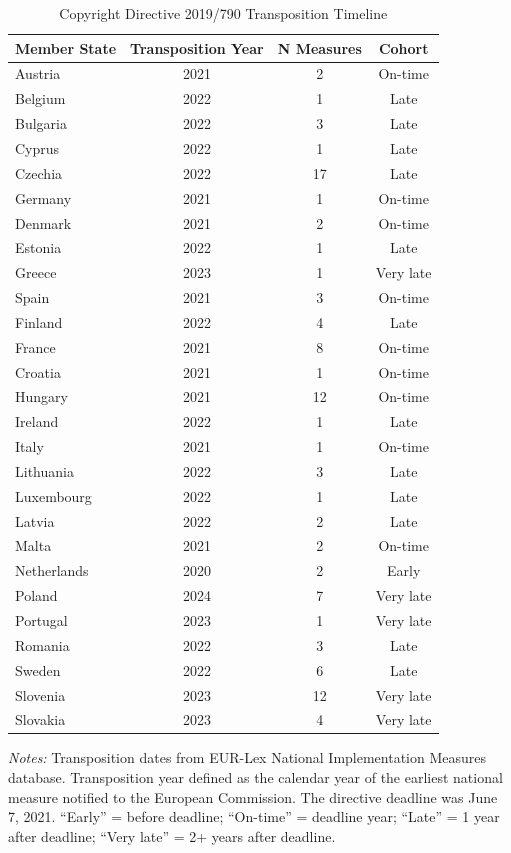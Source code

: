 \begin{table}[htbp]
\centering
\caption{Copyright Directive 2019/790 Transposition Timeline}
\label{tab:timeline}
\begin{tabular}{lccc}
\toprule
Member State & Transposition Year & N Measures & Cohort \\
\midrule
Austria & 2021 & 2 & On-time \\
Belgium & 2022 & 1 & Late \\
Bulgaria & 2022 & 3 & Late \\
Cyprus & 2022 & 1 & Late \\
Czechia & 2022 & 17 & Late \\
Germany & 2021 & 1 & On-time \\
Denmark & 2021 & 2 & On-time \\
Estonia & 2022 & 1 & Late \\
Greece & 2023 & 1 & Very late \\
Spain & 2021 & 3 & On-time \\
Finland & 2022 & 4 & Late \\
France & 2021 & 8 & On-time \\
Croatia & 2021 & 1 & On-time \\
Hungary & 2021 & 12 & On-time \\
Ireland & 2022 & 1 & Late \\
Italy & 2021 & 1 & On-time \\
Lithuania & 2022 & 3 & Late \\
Luxembourg & 2022 & 1 & Late \\
Latvia & 2022 & 2 & Late \\
Malta & 2021 & 2 & On-time \\
Netherlands & 2020 & 2 & Early \\
Poland & 2024 & 7 & Very late \\
Portugal & 2023 & 1 & Very late \\
Romania & 2022 & 3 & Late \\
Sweden & 2022 & 6 & Late \\
Slovenia & 2023 & 12 & Very late \\
Slovakia & 2023 & 4 & Very late \\
\bottomrule
\end{tabular}
\begin{tablenotes}
\small
\item \textit{Notes:} Transposition dates from EUR-Lex National Implementation Measures database. Transposition year defined as the calendar year of the earliest national measure notified to the European Commission. The directive deadline was June 7, 2021. ``Early'' = before deadline; ``On-time'' = deadline year; ``Late'' = 1 year after deadline; ``Very late'' = 2+ years after deadline.
\end{tablenotes}
\end{table}
